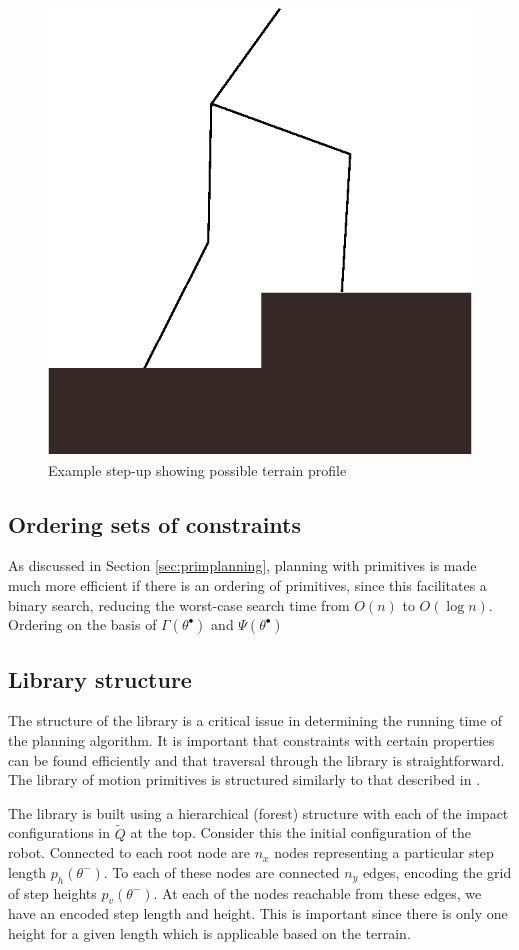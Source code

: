 \begin{figure}
	\centering
	\includegraphics[width=0.5\linewidth]{4VirtConstLib/stepup.eps}
	\caption{Example step-up showing possible terrain profile}
	\label{fig:stepup}
\end{figure}

\subsection{Ordering sets of constraints} \label{sec:orderings}
As discussed in Section \ref{sec:primplanning}, planning with primitives is made much more efficient if there is an ordering of primitives, since this facilitates a binary search, reducing the worst-case search time from $O(n)$ to $O(\log n)$. Ordering on the basis of $\Gamma(\theta^\bullet)$ and $\Psi(\theta^\bullet)$

\subsection{Library structure}
The structure of the library is a critical issue in determining the running time of the planning algorithm. It is important that constraints with certain properties can be found efficiently and that traversal through the library is straightforward. The library of motion primitives is structured similarly to that described in \cite{manchester13planning}.

The library is built using a hierarchical (forest) structure with each of the impact configurations in $\tilde{Q}$ at the top. Consider this the initial configuration of the robot. Connected to each root node are $n_x$ nodes representing a particular step length $p_h(\theta^-)$. To each of these nodes are connected $n_y$ edges, encoding the grid of step heights $p_v(\theta^-)$. At each of the nodes reachable from these edges, we have an encoded step length and height. This is important since there is only one height for a given length which is applicable based on the terrain.


